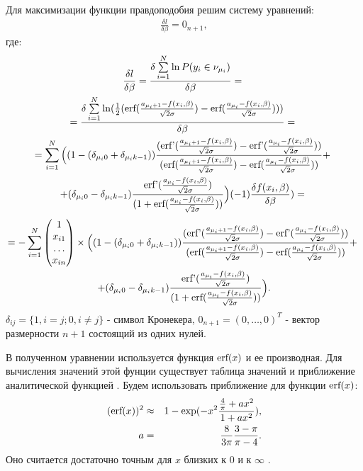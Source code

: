 Для максимизации функции правдоподобия решим систему уравнений:
\begin{eqnarray}
    \label{eq24}\frac{\delta l}{\delta \beta}=0_{n+1},
\end{eqnarray}
где:
\begin{multline}
    \label{eq27}\frac{\delta l}{\delta \beta}=\frac{\delta \sum\limits_{i=1}^{N}\ln P(y_i\in \nu_{\mu_i})}{\delta \beta}=~\\
    =\frac{\delta \sum\limits_{i=1}^{N} \ln(\frac{1}{2}(\textup{erf}(\frac{a_{\mu_i+1}-f(x_i,\beta)}{\sqrt{2}\sigma})-\textup{erf}(\frac{a_{\mu_i}-f(x_i,\beta)}{\sqrt{2}\sigma})) )         }{\delta \beta}=~\\
    =  \sum\limits_{i=1}^{N}\Big((1-(\delta_{\mu_i 0}+\delta_{\mu_i k-1}))\frac{(\textup{erf'}(\frac{a_{\mu_i+1}-f(x_i,\beta)}{\sqrt{2}\sigma})-\textup{erf'}(\frac{a_{\mu_i}-f(x_i,\beta)}{\sqrt{2}\sigma}))}{ (\textup{erf}(\frac{a_{\mu_i+1}-f(x_i,\beta)}{\sqrt{2}\sigma})-\textup{erf}(\frac{a_{\mu_i}-f(x_i,\beta)}{\sqrt{2}\sigma}))}+~\\
    +(\delta_{\mu_i 0}-\delta_{\mu_i k-1})\frac{\textup{erf'}(\frac{a_{\mu_i}-f(x_i,\beta)}{\sqrt{2}\sigma})}{(1+\textup{erf}(\frac{a_{\mu_i}-f(x_i,\beta)}{\sqrt{2}\sigma}))}\Big)  (-1) \frac{\delta f(x_i,\beta)}{\delta \beta} )=~
\end{multline}
\begin{multline}
    \nonumber 
    =-\sum_{i=1}^{N}\begin{pmatrix}
        1\\
        x_{i1}\\
        \dots\\
        x_{in}
    \end{pmatrix}\times  \Big((1-(\delta_{\mu_i 0}+\delta_{\mu_i k-1}))\frac{(\textup{erf'}(\frac{a_{\mu_i+1}-f(x_i,\beta)}{\sqrt{2}\sigma})-\textup{erf'}(\frac{a_{\mu_i}-f(x_i,\beta)}{\sqrt{2}\sigma}))}{ (\textup{erf}(\frac{a_{\mu_i+1}-f(x_i,\beta)}{\sqrt{2}\sigma})-\textup{erf}(\frac{a_{\mu_i}-f(x_i,\beta)}{\sqrt{2}\sigma}))}+~\\
    +(\delta_{\mu_i 0}-\delta_{\mu_i k-1})\frac{\textup{erf'}(\frac{a_{\mu_i}-f(x_i,\beta)}{\sqrt{2}\sigma})}{(1+\textup{erf}(\frac{a_{\mu_i}-f(x_i,\beta)}{\sqrt{2}\sigma}))}\Big) .
\end{multline}
$\delta_{ij} = \{1, i=j; 0, i\neq j\}$ - символ Кронекера, $0_{n+1}=(0, \dots, 0)^T$ - вектор размерности $n+1$ состоящий из одних нулей.

В полученном уравнении используется функция $\textup{erf}(x)$ и ее производная. Для вычисления значений этой фунции существует таблица значений и приближение аналитической функцией \cite{Winitzki}.
Будем использовать приближение для функции $\textup{erf}(x)$:
\begin{eqnarray}
    \label{eq25}(\textup{erf} (x))^2&\approx& 1- \exp(-x^2 \frac{\frac{4}{\pi}+ax^2}{1+ax^2}),\\
    \nonumber a&=&\frac{8}{3\pi}\frac{3-\pi}{\pi -4}.
\end{eqnarray}
Оно считается достаточно точным для $x$ близких к $0$ и к $\infty$ \cite{Winitzki}. \hfill\break

